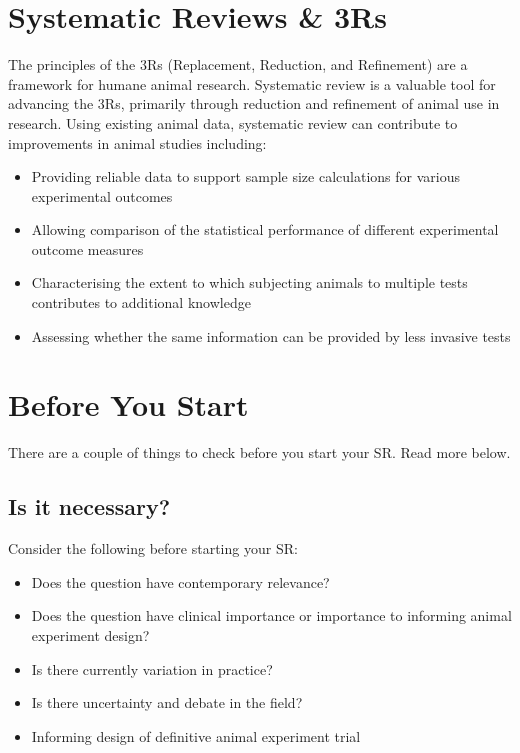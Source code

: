 \documentclass[
]{book}
\providecommand{\tightlist}{%
  \setlength{\itemsep}{0pt}\setlength{\parskip}{0pt}}
\begin{document}
\hypertarget{srs-3rs}{%
\chapter{Systematic Reviews \& 3Rs}\label{srs-3rs}}

The principles of the 3Rs (Replacement, Reduction, and Refinement) are a framework for humane animal research. Systematic review is a valuable tool for advancing the 3Rs, primarily through reduction and refinement of animal use in research. Using existing animal data, systematic review can contribute to improvements in animal studies including:

\begin{itemize}
\tightlist
\item
  Providing reliable data to support sample size calculations for various experimental outcomes
\item
  Allowing comparison of the statistical performance of different experimental outcome measures
\item
  Characterising the extent to which subjecting animals to multiple tests contributes to additional knowledge
\item
  Assessing whether the same information can be provided by less invasive tests
\end{itemize}

\hypertarget{b4ustart}{%
\chapter{Before You Start}\label{b4ustart}}

There are a couple of things to check before you start your SR. Read more below.

\hypertarget{is-it-necessary}{%
\section{Is it necessary?}\label{is-it-necessary}}

Consider the following before starting your SR:

\begin{itemize}
\tightlist
\item
  Does the question have contemporary relevance?
\item
  Does the question have clinical importance or importance to informing animal experiment design?
\item
  Is there currently variation in practice?
\item
  Is there uncertainty and debate in the field?
\item
  Informing design of definitive animal experiment trial
\end{itemize}
\end{document}
